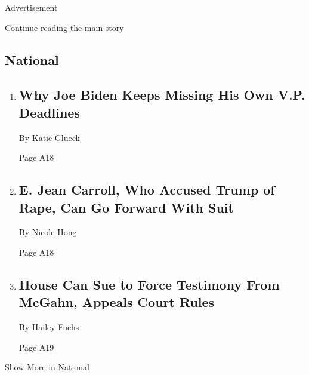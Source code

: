 Advertisement

\protect\hyperlink{after-mid2}{Continue reading the main story}

\hypertarget{national}{%
\subsection{National}\label{national}}

\begin{enumerate}
\def\labelenumi{\arabic{enumi}.}
\item
  \href{/2020/08/07/us/politics/joe-biden-vice-presidential-search.html}{}

  \hypertarget{why-joe-biden-keeps-missing-his-own-vp-deadlines-1}{%
  \subsection{Why Joe Biden Keeps Missing His Own V.P.
  Deadlines}\label{why-joe-biden-keeps-missing-his-own-vp-deadlines-1}}

  By Katie Glueck

  Page A18
\item
  \href{/2020/08/07/nyregion/jean-caroll-donald-trump-lawsuit-rape.html}{}

  \hypertarget{e-jean-carroll-who-accused-trump-of-rape-can-go-forward-with-suit}{%
  \subsection{E. Jean Carroll, Who Accused Trump of Rape, Can Go Forward
  With
  Suit}\label{e-jean-carroll-who-accused-trump-of-rape-can-go-forward-with-suit}}

  By Nicole Hong

  Page A18
\item
  \href{/2020/08/07/us/politics/donald-mcgahn-congress-lawsuit.html}{}

  \hypertarget{house-can-sue-to-force-testimony-from-mcgahn-appeals-court-rules}{%
  \subsection{House Can Sue to Force Testimony From McGahn, Appeals
  Court
  Rules}\label{house-can-sue-to-force-testimony-from-mcgahn-appeals-court-rules}}

  By Hailey Fuchs

  Page A19
\end{enumerate}

Show More in National

